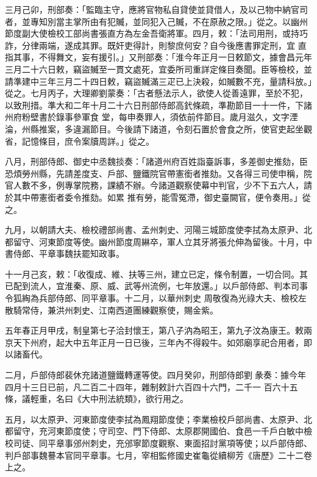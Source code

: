 \begin{pinyinscope}
 三月己卯，刑部奏：「監臨主守，應將官物私自貸使並貸借人，及以己物中納官司者，並專知別當主掌所由有犯贓，並同犯入己贓，不在原赦之限。」從之。以幽州節度副大使檢校工部尚書張直方為左金吾衛將軍。四月，敕：「法司用刑，或持巧詐，分律兩端，遂成其罪。既奸吏得計，則黎庶何安？自今後應書罪定刑，宜
 直指其事，不得舞文，妄有援引。」又刑部奏：「淮今年正月一日敕節文，據會昌元年三月二十六日敕，竊盜贓至一貫文處死，宜委所司重詳定條目奏聞。臣等檢校，並請準建中三年三月二十四日敕，竊盜贓滿三疋已上決殺，如贓數不充，量請科放。」從之。七月丙子，大理卿劉蒙奏：「古者懸法示人，欲使人從善遠罪，至於不犯，以致刑措。準大和二年十月二十六日刑部侍郎高釴條疏，準勘節目一十一件，下諸州府粉壁書於錄事參軍食
 堂，每申奏罪人，須依前件節目。歲月滋久，文字湮淪，州縣推案，多違漏節目。今後請下諸道，令刻石置於會食之所，使官吏起坐觀省，記憶條目，庶令案牘周詳。」從之。



 八月，刑部侍郎、御史中丞魏掞奏：「諸道州府百姓詣臺訴事，多差御史推劾，臣恐煩勞州縣，先請差度支、戶部、鹽鐵院官帶憲銜者推劾。又各得三司使申稱，院官人數不多，例專掌院務，課績不辦。今諸道觀察使幕中判官，少不下五六人，請於其中帶憲銜者委令推劾。如累
 推有勞，能雪冤滯，御史臺闕官，便令奏用。」從之。



 九月，以朝請大夫、檢校禮部尚書、孟州刺史、河陽三城節度使李拭為太原尹、北都留守、河東節度等使。幽州節度周綝卒，軍人立其牙將張允伸為留後。十月，中書侍郎、平章事魏扶罷知政事。



 十一月己亥，敕：「收復成、維、扶等三州，建立已定，條令制置，一切合同。其已配到流人，宜淮秦、原、威、武等州流例，七年放還。」以戶部侍郎、判本司事令狐綯為兵部侍郎、同平章事。十二月，以華州刺史
 周敬復為光祿大夫、檢校左散騎常侍，兼洪州刺史、江南西道團練觀察使，賜金紫。



 五年春正月甲戌，制皇第七子洽封懷王，第八子汭為昭王，第九子汶為康王。敕兩京天下州府，起大中五年正月一日已後，三年內不得殺牛。如郊廟享祀合用者，即以諸畜代。



 二月，戶部侍郎裴休充諸道鹽鐵轉運等使。四月癸卯，刑部侍郎劉彖奏：據今年四月十三日已前，凡二百二十四年，雜制敕計六百四十六門，二千一
 百六十五條，議輕重，名曰《大中刑法統類》，欲行用之。



 五月，以太原尹、河東節度使李拭為鳳翔節度使；李業檢校戶部尚書、太原尹、北都留守，充河東節度使；守司空、門下侍郎、太原郡開國伯、食邑一千戶白敏中檢校司徒、同平章事邠州刺史，充邠寧節度觀察、東面招討黨項等使；以戶部侍郎、判戶部事魏謩本官同平章事。七月，宰相監修國史崔龜從續柳芳《唐歷》二十二卷上之。




\end{pinyinscope}
